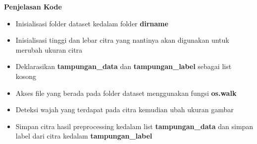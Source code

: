 \documentclass[
  letterpaper,
  DIV=11,
  numbers=noendperiod]{scrreprt}
\providecommand{\tightlist}{%
  \setlength{\itemsep}{0pt}\setlength{\parskip}{0pt}}\usepackage{longtable,booktabs,array}
\begin{document}
\begin{tcolorbox}[enhanced jigsaw, opacityback=0, colbacktitle=quarto-callout-tip-color!10!white, breakable, titlerule=0mm, left=2mm, toptitle=1mm, rightrule=.15mm, leftrule=.75mm, colback=white, opacitybacktitle=0.6, arc=.35mm, toprule=.15mm, coltitle=black, colframe=quarto-callout-tip-color-frame, bottomtitle=1mm, title=\textcolor{quarto-callout-tip-color}{\faLightbulb}\hspace{0.5em}{Tip}, bottomrule=.15mm]

\textbf{Penjelasan Kode}

\begin{itemize}
\tightlist
\item
  Inisialisasi folder dataset kedalam folder \textbf{dirname}\\
\item
  Inisialisasi tinggi dan lebar citra yang nantinya akan digunakan untuk
  merubah ukuran citra\\
\item
  Deklarasikan \textbf{tampungan\_data} dan \textbf{tampungan\_label}
  sebagai list kosong\\
\item
  Akses file yang berada pada folder dataset menggunakan fungsi
  \textbf{os.walk}\\
\item
  Deteksi wajah yang terdapat pada citra kemudian ubah ukuran gambar\\
\item
  Simpan citra hasil preprocessing kedalam list \textbf{tampungan\_data}
  dan simpan label dari citra kedalam \textbf{tampungan\_label}
\end{itemize}

\end{tcolorbox}
\end{document}
